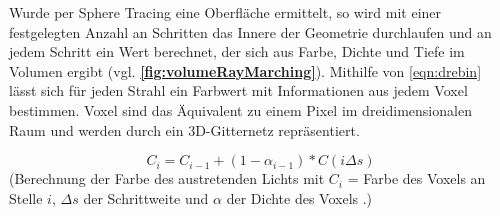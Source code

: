 Wurde per Sphere Tracing eine Oberfläche ermittelt, so wird mit einer festgelegten Anzahl an Schritten das Innere der Geometrie durchlaufen
und an jedem Schritt ein Wert berechnet, der sich aus Farbe, Dichte und Tiefe im Volumen ergibt (vgl. \textbf{\autoref{fig:volumeRayMarching}}).
Mithilfe von \autoref{eqn:drebin} lässt sich für jeden Strahl ein Farbwert mit Informationen aus jedem Voxel bestimmen.
Voxel sind das Äquivalent zu einem Pixel im dreidimensionalen Raum und werden durch ein 3D-Gitternetz repräsentiert.

\begin{equation}
	\label{eqn:drebin}
	C_{i} = C_{i-1} + (1-\alpha_{i-1}) * C(i\Delta s)
\end{equation}
(Berechnung der Farbe des austretenden Lichts mit $C_i$ = Farbe des Voxels an Stelle $i$, 
$\Delta s$ der Schrittweite und $\alpha$ der Dichte des Voxels .)